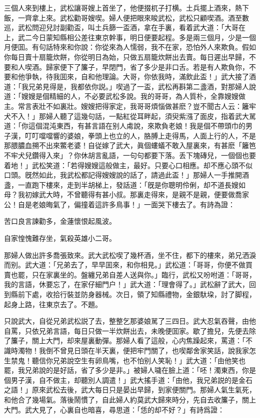 三個人來到樓上，武松讓哥嫂上首坐了，他便掇杌子打横。土兵擺上酒來，熱下飯，一齊拿上來。武松勸哥嫂喫。婦人便把眼來睃武松，武松只顧喫酒。酒至數巡，武松問迎兒討副勸盃，叫土兵篩一盃酒，拿在手裏，看着武大道：「大哥在上，武二今日蒙知縣相公差往東京幹事，明日便要起程。多是兩三個月，少是一個月便囬。有句話特來和你說：你從來為人懦弱，我不在家，恐怕外人來欺負。假如你每日賣十扇籠炊餅，你從明日為始，只做五扇籠炊餅出去賣。每日遲出早歸，不要和人喫酒。歸家便下了簾子，早閉門，省了多少是非口舌。若是有人欺負你，不要和他爭執，待我囬來，自和他理論。大哥，你依我時，滿飲此盃！」武大接了酒道：「我兄弟見得是，我都依你説。」喫過了一盃，武松再斟第二盞酒，對那婦人說道：「嫂嫂是個精細的人，不必要武松多說。我的哥哥，為人質朴，全靠嫂嫂做主。常言表壯不如裏壯。嫂嫂把得家定，我哥哥煩惱做甚麽？豈不聞古人云：籬牢犬不入！」那婦人聽了這幾句話，一點紅從耳畔起，須臾紫漒了面皮，指着武大駡道：「你這個混沌東西，有甚言語在别人䖏說，來欺負老娘！我是個不帶頭巾的男子漢，叮叮噹噹響的婆娘，拳頭上也立的人，胳膊上走得馬，人面上行的人，不是那腲膿血搠不出來鱉老婆！自従嫁了武大，眞個螻蟻不敢入屋裏來，有甚麽「籬笆不牢犬兒鑽得入來」？你休胡言亂語，一句句都要下落。丢下塊磚兒，一個個也要着地！」武松笑道：「若得嫂嫂這般做主，最好。只要心口相應。却不應心頭不似口頭。旣然如此，我武松都記得嫂嫂說的話了，請過此盃！」那婦人一手推開酒盞，一直跑下樓來，走到半胡梯上，發話道：「旣是你聰明伶俐，却不道長嫂如母？我初嫁武大時，不曾聽得有甚小叔。那裏走得來，是親不是親，便要做喬家公！自是老娘晦氣了，偏撞着這許多鳥事！」一面哭下樓去了。有詩為證：

\begin{myquote}
苦口良言諫勸多，金蓮懷恨起風波。

自家惶愧難存坐，氣殺英雄小二哥。
\end{myquote}

那婦人做出許多喬張致來。武大武松喫了幾杯酒，坐不住，都下的樓來，弟兄洒淚而别。武大道：「兄弟去了，早早囬來，和你相見。」武松道：「哥哥，你便不做買賣也罷，只在家裏坐的。盤纏兄弟自差人送與你。」臨行，武松又吩咐道：「哥哥，我的言語，休要忘了，在家仔細門户！」武大道：「理會得了。」武松辭了武大，回到縣前下處，收拾行裝並防身器械。次日，領了知縣禮物，金銀馱垜，討了脚程，起身上路，往東京去了。不題。

只說武大，自從兄弟武松説了去，整整乞那婆娘駡了三四日。武大忍氣吞聲，由他自罵，只依兄弟言語，每日只做一半炊餅出去，未晚便囬家。歇了擔兒，先便去除了簾子，關上大門，却來屋裏動彈。那婦人看了這般，心内焦躁起來，罵道：「不識時濁物！我倒不曾見日頭在半天裏，便把牢門關了，也喫鄰舍家笑話，說我家怎生禁鬼！聽信你兄弟說空生有卵鳥嘴，也不怕别人笑恥！」武大道：「由他笑也罷，我兄弟說的是好話，省了多少是非。」被婦人噦在臉上道：「呸！濁東西，你是個男子漢，自不做主，却聽別人調遣！」武大搖手道：「由他，我兄弟説的是金石之語！」原來武松去後，武大每日只是晏出早歸，到家便關門。那婦人氣生氣死，和他合了幾場氣。落後鬧慣了，自此婦人約莫武大歸來時分，先自去收簾子，關上大門。武大見了，心裏自也暗喜，尋思道：「恁的却不好？」有詩爲證：


